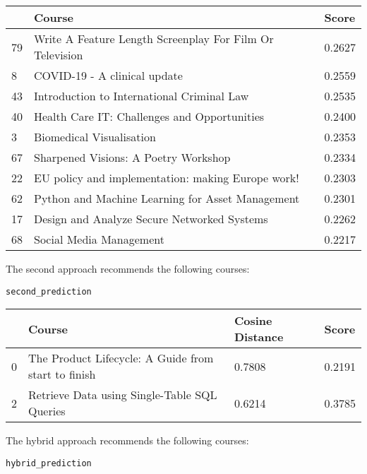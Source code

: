 \begin{table}[H]
\small
\begin{tabular}{|p{0.5cm}|p{10cm}|p{1.5cm}|}
\hline
& Course & Score \\
\hline
79 & Write A Feature Length Screenplay For Film Or Television & 0.2627 \\
8 & COVID-19 - A clinical update & 0.2559 \\
43 & Introduction to International Criminal Law & 0.2535 \\
40 & Health Care IT: Challenges and Opportunities & 0.2400 \\
3 & Biomedical Visualisation & 0.2353 \\
67 & Sharpened Visions: A Poetry Workshop & 0.2334 \\
22 & EU policy and implementation: making Europe work! & 0.2303 \\
62 & Python and Machine Learning for Asset Management & 0.2301 \\
17 & Design and Analyze Secure Networked Systems & 0.2262 \\
68 & Social Media Management & 0.2217 \\
\hline
\end{tabular}
\end{table}

\noindent The second approach recommends the following courses:

\begin{verbatim}
second_prediction
\end{verbatim}

\begin{table}[H]
\small
\begin{tabular}{|p{0.5cm}|p{10cm}|p{1.5cm}|p{1.5cm}|}
\hline
& Course & Cosine Distance & Score \\
\hline
0 & The Product Lifecycle: A Guide from start to finish & 0.7808 & 0.2191 \\
2 & Retrieve Data using Single-Table SQL Queries & 0.6214 & 0.3785 \\
\hline
\end{tabular}
\end{table}

\noindent The hybrid approach recommends the following courses:

\begin{verbatim}
hybrid_prediction
\end{verbatim}

